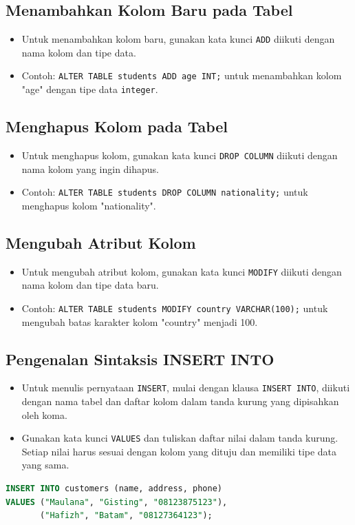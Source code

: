 \documentclass{article}
\begin{document}
\subsection{Menambahkan Kolom Baru pada Tabel}
\begin{itemize}
    \item Untuk menambahkan kolom baru, gunakan kata kunci \texttt{ADD} diikuti dengan nama kolom dan tipe data.
    \item Contoh: \texttt{ALTER TABLE students ADD age INT;} untuk menambahkan kolom "age" dengan tipe data \texttt{integer}.
\end{itemize}

\subsection{Menghapus Kolom pada Tabel}
\begin{itemize}
    \item Untuk menghapus kolom, gunakan kata kunci \texttt{DROP COLUMN} diikuti dengan nama kolom yang ingin dihapus.
    \item Contoh: \texttt{ALTER TABLE students DROP COLUMN nationality;} untuk menghapus kolom "nationality".
\end{itemize}

\subsection{Mengubah Atribut Kolom}
\begin{itemize}
    \item Untuk mengubah atribut kolom, gunakan kata kunci \texttt{MODIFY} diikuti dengan nama kolom dan tipe data baru.
    \item Contoh: \texttt{ALTER TABLE students MODIFY country VARCHAR(100);} untuk mengubah batas karakter kolom "country" menjadi 100.
\end{itemize}

\subsection{Pengenalan Sintaksis INSERT INTO}
\begin{itemize}
    \item Untuk menulis pernyataan \texttt{INSERT}, mulai dengan klausa \texttt{INSERT INTO}, diikuti dengan nama tabel dan daftar kolom dalam tanda kurung yang dipisahkan oleh koma.
    \item Gunakan kata kunci \texttt{VALUES} dan tuliskan daftar nilai dalam tanda kurung. Setiap nilai harus sesuai dengan kolom yang dituju dan memiliki tipe data yang sama.
\end{itemize}
\begin{lstlisting}[language=SQL, caption={Perintah INSERT INTO dengan Satu dan Banyak Baris}, captionpos=b]
INSERT INTO customers (name, address, phone) 
VALUES ("Maulana", "Gisting", "08123875123"), 
       ("Hafizh", "Batam", "08127364123");
\end{lstlisting}
\end{document}

